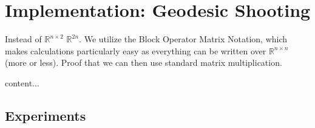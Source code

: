 \section{Implementation: Geodesic Shooting}

Instead of $\mathbb{R}^{n\times2}$ $\mathbb{R}^{2n}$.
We utilize the Block Operator Matrix Notation, which makes calculations particularly easy as everything can be written over $\mathbb{R}^{n\times n}$ (more or less).
Proof that we can then use standard matrix multiplication.

\begin{definition}
	content...
\end{definition}

\subsection{Experiments}